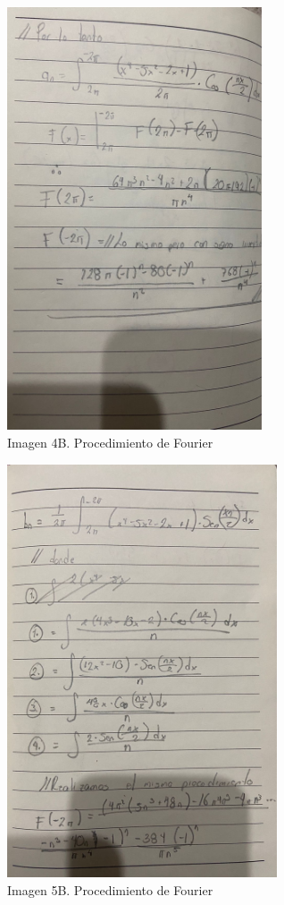 \begin{figure}[H]
	\centering
	\includegraphics[width=2.97297in,height=4.92052in]{media/image2.jpg}
	\caption{Imagen 4B. Procedimiento de Fourier}
\end{figure}

\begin{figure}[H]
	\centering
	\includegraphics[width=3.1436in,height=4.80787in]{media/image9.jpg}
	\caption{Imagen 5B. Procedimiento de Fourier}
\end{figure}

